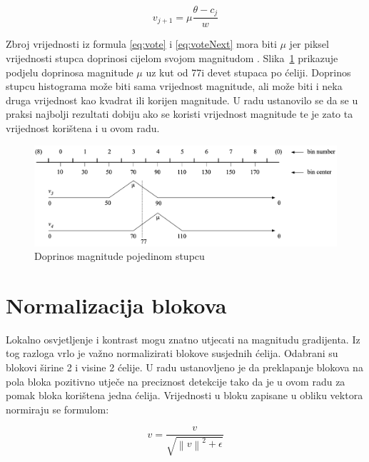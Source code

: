 \documentclass[times, utf8, zavrsni]{fer}
\begin{document}
 \begin{equation}
 	v_{j+1} = \mu \frac{\theta - c_j}{w}
 	\label{eq:voteNext}
\end{equation}

Zbroj vrijednosti iz formula \ref{eq:vote} i \ref{eq:voteNext} mora biti \(\mu\) jer piksel vrijednosti stupca doprinosi cijelom svojom magnitudom \citep{tomasi2012histograms}. Slika~\ref{fig:vote} prikazuje podjelu doprinosa magnitude \(\mu \) uz kut od 77\degree i devet stupaca po ćeliji. Doprinos stupcu histograma može biti sama vrijednost magnitude, ali može biti i neka druga vrijednost kao kvadrat ili korijen magnitude. U radu \cite{dalal2005histograms} ustanovilo se da se u praksi najbolji rezultati dobiju ako se koristi vrijednost magnitude te je zato ta vrijednost korištena i u ovom radu.

\begin{figure}[htb]
	\centering
	\includegraphics[width=\linewidth]{figures/vote.png}
	\caption{Doprinos magnitude pojedinom stupcu\protect\footnotemark}
	\label{fig:vote}
\end{figure}


\section{Normalizacija blokova}
Lokalno osvjetljenje i kontrast mogu znatno utjecati na magnitudu gradijenta. Iz tog razloga vrlo je važno normalizirati blokove susjednih ćelija. Odabrani su blokovi širine 2 i visine 2 ćelije. U radu \cite{dalal2005histograms} ustanovljeno je da preklapanje blokova na pola bloka pozitivno utječe na preciznost detekcije tako da je u ovom radu za pomak bloka korištena jedna ćelija. Vrijednosti u bloku zapisane u obliku vektora normiraju se formulom:

\begin{equation}
	v = \frac{v}{\sqrt{\left\|v\right\|^2 + \epsilon}}
	\label{eq:norm}
\end{equation}
\end{document}

